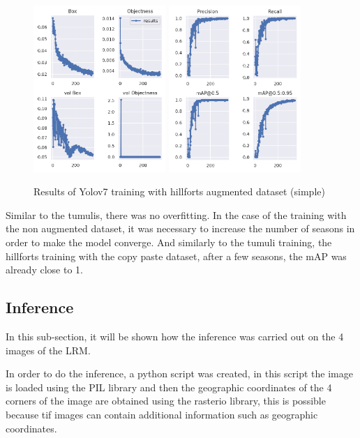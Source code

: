 \begin{figure}[H]
    \centering
    {{\includegraphics[width=5cm]{images/training/castros/maia1.png} }}
    \qquad
    {{\includegraphics[width=5cm]{images/training/castros/maia2.png} }}
    \caption{Results of Yolov7 training with hillforts augmented dataset (simple)}
    \label{fig:hillyolomaia}
\end{figure}

Similar to the tumulis, there was no overfitting. In the case of the training with the non augmented dataset, it was necessary to increase the number of seasons in order to make the model converge. And similarly to the tumuli training, the hillforts training with the copy paste dataset, after a few seasons, the mAP was already close to 1.



\subsection{Inference}
In this sub-section, it will be shown how the inference was carried out on the 4 images of the LRM.

In order to do the inference, a python script was created, in this script the image is loaded using the PIL library and then the geographic coordinates of the 4 corners of the image are obtained using the rasterio library, this is possible because tif images can contain additional information such as geographic coordinates. 

